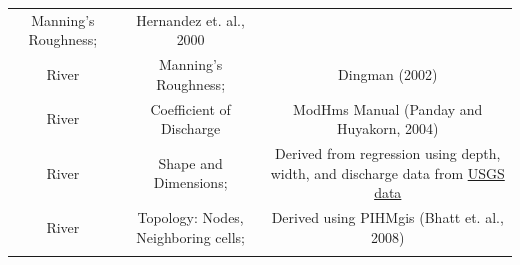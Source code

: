 \documentclass[]{scrbook}
\begin{document}
\begin{longtable}[]{@{}ccc@{}}
\begin{minipage}[t]{0.19\columnwidth}
Manning's Roughness;\strut
\end{minipage} & \begin{minipage}[t]{0.42\columnwidth}\centering\strut
Hernandez et. al., 2000\strut
\end{minipage}\tabularnewline
\begin{minipage}[t]{0.11\columnwidth}\centering\strut
River\strut
\end{minipage} & \begin{minipage}[t]{0.19\columnwidth}\centering\strut
Manning's Roughness;\strut
\end{minipage} & \begin{minipage}[t]{0.42\columnwidth}\centering\strut
Dingman (2002)\strut
\end{minipage}\tabularnewline
\begin{minipage}[t]{0.11\columnwidth}\centering\strut
River\strut
\end{minipage} & \begin{minipage}[t]{0.19\columnwidth}\centering\strut
Coefficient of Discharge\strut
\end{minipage} & \begin{minipage}[t]{0.42\columnwidth}\centering\strut
ModHms Manual (Panday and Huyakorn, 2004)\strut
\end{minipage}\tabularnewline
\begin{minipage}[t]{0.11\columnwidth}\centering\strut
River\strut
\end{minipage} & \begin{minipage}[t]{0.19\columnwidth}\centering\strut
Shape and Dimensions;\strut
\end{minipage} & \begin{minipage}[t]{0.42\columnwidth}\centering\strut
Derived from regression using depth, width, and discharge data from
\href{http://nwis.waterdata.usgs.gov/usa/nwis/measurements}{USGS
data}\strut
\end{minipage}\tabularnewline
\begin{minipage}[t]{0.11\columnwidth}\centering\strut
River\strut
\end{minipage} & \begin{minipage}[t]{0.19\columnwidth}\centering\strut
Topology: Nodes, Neighboring cells;\strut
\end{minipage} & \begin{minipage}[t]{0.42\columnwidth}\centering\strut
Derived using PIHMgis (Bhatt et. al., 2008)\strut
\end{minipage}\tabularnewline
\begin{minipage}[t]{0.11\columnwidth}\centering\strut

\end{minipage}
\end{longtable}
\end{document}
